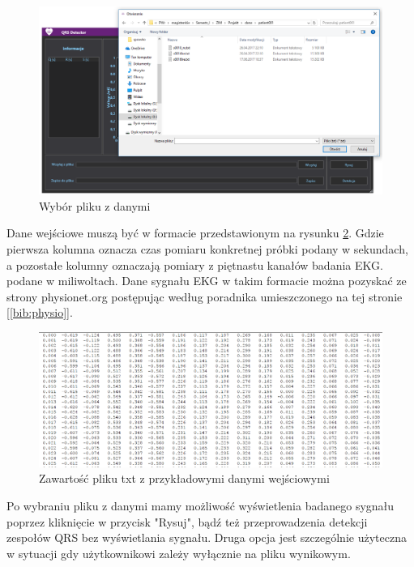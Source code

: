 \documentclass[11pt]{report}
\begin{document}
	\begin{figure} [H]
		\centering
		\includegraphics[width=1\linewidth]{okno_dialogowe.png}
		\caption{Wybór pliku z danymi}
		\label{fig:okno_dialogowe}
	\end{figure}
	\vspace{2cm}
	
	Dane wejściowe muszą być w formacie przedstawionym na rysunku \ref{fig:wejscie}. Gdzie pierwsza kolumna oznacza czas pomiaru konkretnej próbki podany w sekundach, a pozostałe kolumny oznaczają pomiary z piętnastu kanałów badania EKG. podane w miliwoltach. Dane sygnału EKG w takim formacie można pozyskać ze strony physionet.org postępując według poradnika umieszczonego na tej stronie [\ref{bib:physio}].
	\begin{figure} [H]
		\centering
		\includegraphics[width=1\linewidth]{wejscie.png}
		\caption{Zawartość pliku txt z przykładowymi danymi wejściowymi}
		\label{fig:wejscie}
	\end{figure}
	\vspace{2cm}

	Po wybraniu pliku z danymi mamy możliwość wyświetlenia badanego sygnału poprzez kliknięcie w przycisk "Rysuj", bądź też przeprowadzenia detekcji zespołów QRS bez wyświetlania sygnału. Druga opcja jest szczególnie użyteczna w sytuacji gdy użytkownikowi zależy wyłącznie na pliku wynikowym.
		
\end{document}
